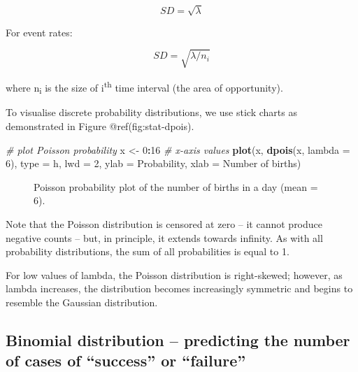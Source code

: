 \documentclass[
]{book}
\makeatletter
\newenvironment{Shaded}{\begin{snugshade}}{\end{snugshade}}
\newcommand{\AttributeTok}[1]{\textcolor[rgb]{0.13,0.29,0.53}{#1}}
\newcommand{\CommentTok}[1]{\textcolor[rgb]{0.56,0.35,0.01}{\textit{#1}}}
\newcommand{\DecValTok}[1]{\textcolor[rgb]{0.00,0.00,0.81}{#1}}
\newcommand{\FunctionTok}[1]{\textcolor[rgb]{0.13,0.29,0.53}{\textbf{#1}}}
\newcommand{\NormalTok}[1]{#1}
\newcommand{\OtherTok}[1]{\textcolor[rgb]{0.56,0.35,0.01}{#1}}
\newcommand{\SpecialCharTok}[1]{\textcolor[rgb]{0.81,0.36,0.00}{\textbf{#1}}}
\newcommand{\StringTok}[1]{\textcolor[rgb]{0.31,0.60,0.02}{#1}}
\newcommand*\pandocbounded[1]{%
  \sbox\pandoc@box{#1}%
  \Gscale@div\@tempa{\textheight}{\dimexpr\ht\pandoc@box+\dp\pandoc@box\relax}%
  \Gscale@div\@tempb{\linewidth}{\wd\pandoc@box}%
  \ifdim\@tempb\p@<\@tempa\p@\let\@tempa\@tempb\fi%
  \ifdim\@tempa\p@<\p@\scalebox{\@tempa}{\usebox\pandoc@box}%
  \else\usebox{\pandoc@box}%
  \fi%
}
\makeatother
\begin{document}
\[SD = \sqrt{\lambda}\]

For event rates:

\[SD = \sqrt{\lambda / n_i}\]

where n\textsubscript{i} is the size of i\textsuperscript{th} time
interval (the area of opportunity).

To visualise discrete probability distributions, we use stick charts as
demonstrated in Figure @ref(fig:stat-dpois).

\begin{Shaded}
\begin{Highlighting}[]
\CommentTok{\# plot Poisson probability}
\NormalTok{x }\OtherTok{\textless{}{-}} \DecValTok{0}\SpecialCharTok{:}\DecValTok{16} \CommentTok{\# x{-}axis values}
\FunctionTok{plot}\NormalTok{(x, }\FunctionTok{dpois}\NormalTok{(x, }\AttributeTok{lambda =} \DecValTok{6}\NormalTok{), }
     \AttributeTok{type =} \StringTok{\textquotesingle{}h\textquotesingle{}}\NormalTok{,}
     \AttributeTok{lwd  =} \DecValTok{2}\NormalTok{,}
     \AttributeTok{ylab =} \StringTok{\textquotesingle{}Probability\textquotesingle{}}\NormalTok{,}
     \AttributeTok{xlab =} \StringTok{\textquotesingle{}Number of births\textquotesingle{}}\NormalTok{)}
\end{Highlighting}
\end{Shaded}

\begin{figure}
\centering
\pandocbounded{}
\caption{Poisson probability plot of the number of births in a day (mean
= 6).}
\end{figure}

Note that the Poisson distribution is censored at zero -- it cannot
produce negative counts -- but, in principle, it extends towards
infinity. As with all probability distributions, the sum of all
probabilities is equal to 1.

For low values of lambda, the Poisson distribution is right-skewed;
however, as lambda increases, the distribution becomes increasingly
symmetric and begins to resemble the Gaussian distribution.

\subsection{Binomial distribution -- predicting the number of cases of
``success'' or
``failure''}\label{binomial-distribution-predicting-the-number-of-cases-of-success-or-failure}
\end{document}
